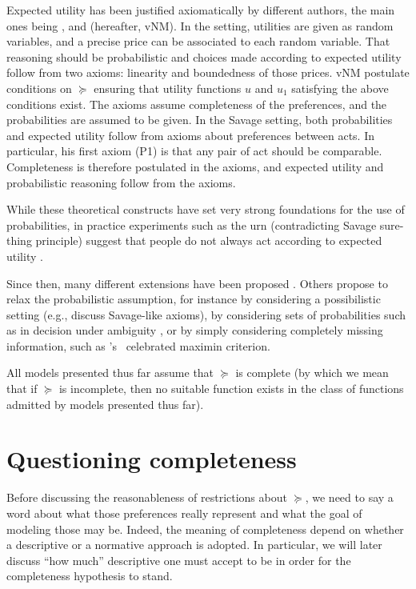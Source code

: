 \documentclass[french, english]{llncs}
\begin{document}
Expected utility has been justified axiomatically by different authors, the main ones being \citet{savage_foundations_1972}, \citet{definetti_probability_2017} and \citet{von_neumann_theory_2004} (hereafter, vNM). In the \citeauthor{definetti_probability_2017} setting, utilities are given as random variables, and a precise price can be associated to each random variable. That reasoning should be probabilistic and choices made according to expected utility follow from two axioms: linearity and boundedness of those prices. vNM postulate conditions on $\succeq$ ensuring that utility functions $u$ and $u_1$ satisfying the above conditions exist. The axioms assume completeness of the preferences, and the probabilities are assumed to be given. In the Savage setting, both probabilities and expected utility follow from axioms about preferences between acts. In particular, his first axiom (P1) is that any pair of act should be comparable. Completeness is therefore postulated in the axioms, and expected utility and probabilistic reasoning follow from the axioms. 

While these theoretical constructs have set very strong foundations for the use of probabilities, in practice experiments such as the \citet{ellsberg_risk_1961} urn (contradicting Savage sure-thing principle) suggest that people do not always act according to expected utility \citep{maccrimmon_utility_1979}. 
	
Since then, many different extensions have been proposed \citep{wakker_prospect_2010, quiggin_generalized_2012}. Others propose to relax the probabilistic assumption, for instance by considering a possibilistic setting  (e.g., \citet{dubois_qualitative_2003} discuss Savage-like axioms), by considering sets of probabilities such as in decision under ambiguity \citep{gajdos_attitude_2008}, or by simply considering completely missing information, such as \citeauthor{wald_statistical_1992}'s~\citeyearpar{wald_statistical_1992} celebrated maximin criterion. 
	
All models presented thus far assume that $\succeq$ is complete (by which we mean that if $\succeq$ is incomplete, then no suitable function exists in the class of functions admitted by models presented thus far).
	
\section{Questioning completeness}\label{sec:nordesc}
Before discussing the reasonableness of restrictions about $\succeq$, we need to say a word about what those preferences really represent and what the goal of modeling those may be. Indeed, the meaning of completeness depend on whether a descriptive or a normative approach is adopted. In particular, we will later discuss “how much” descriptive one must accept to be in order for the completeness hypothesis to stand.
	
\end{document}
